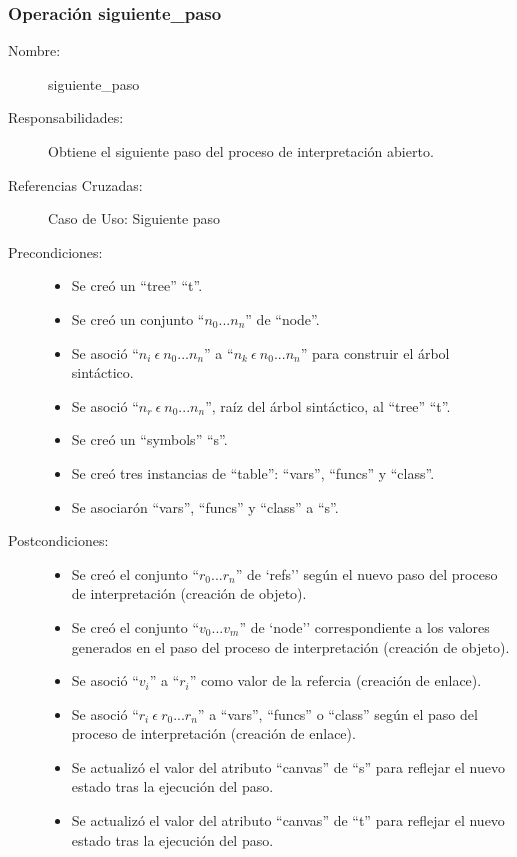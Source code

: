 \subsubsection{Operación siguiente\_paso}
\FloatBarrier
\begin{framed}
	\begin{description}
		\item [Nombre:] siguiente\_paso
		\item [Responsabilidades:] Obtiene el siguiente paso del proceso de interpretación abierto.
		\item [Referencias Cruzadas: ] Caso de Uso: Siguiente paso
      \item [Precondiciones:] \hfill
         \begin {itemize}
         \item Se creó un ``tree'' ``t''.
         \item Se creó un conjunto ``$n_0...n_n$'' de ``node''.
         \item Se asoció ``$n_i\ \epsilon\ n_0...n_n$'' a ``$n_k\ \epsilon\ n_0...n_n$'' para construir el árbol sintáctico.
         \item Se asoció  ``$n_r\ \epsilon\ n_0...n_n$'', raíz del árbol sintáctico, al ``tree'' ``t''.
         \item Se creó un ``symbols'' ``s''.
         \item Se creó tres instancias de ``table'': ``vars'', ``funcs'' y ``class''.
         \item Se asociarón ``vars'', ``funcs'' y ``class'' a ``s''.
      \end{itemize}
      \item [Postcondiciones:] \hfill
      \begin {itemize}
         \item Se creó el conjunto ``$r_0...r_n$'' de `refs'' según el nuevo paso del proceso de interpretación (creación de objeto).
         \item Se creó el conjunto ``$v_0...v_m$'' de `node'' correspondiente a los valores generados en el paso del proceso de interpretación (creación de objeto).
         \item Se asoció ``$v_i$'' a ``$r_i$'' como valor de la refercia (creación de enlace).
         \item Se asoció ``$r_i\ \epsilon \ r_0...r_n$'' a ``vars'', ``funcs'' o ``class'' según el paso del proceso de interpretación (creación de enlace).  
         \item Se actualizó el valor del atributo ``canvas'' de ``s'' para reflejar el nuevo estado tras la ejecución del paso.
         \item Se actualizó el valor del atributo ``canvas'' de ``t'' para reflejar el nuevo estado tras la ejecución del paso.
      \end{itemize}
	\end{description}
\end{framed}
\FloatBarrier

